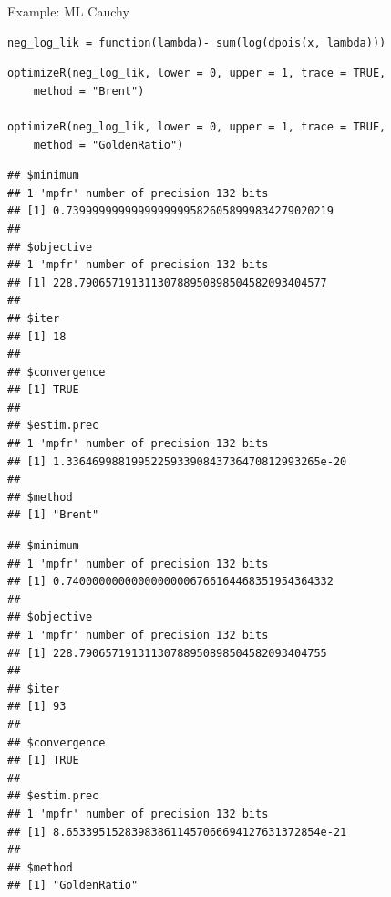 \documentclass[11pt,compress,t,notes=noshow, xcolor=table]{beamer}
\begin{document}
\begin{vbframe}{Example: ML Cauchy}
\begin{verbatim}
neg_log_lik = function(lambda)- sum(log(dpois(x, lambda)))
\end{verbatim}

\vspace{0.2cm}

\begin{verbatim}
optimizeR(neg_log_lik, lower = 0, upper = 1, trace = TRUE, 
	method = "Brent")

optimizeR(neg_log_lik, lower = 0, upper = 1, trace = TRUE, 
	method = "GoldenRatio")

\end{verbatim}







\framebreak 





\begin{verbatim}
## $minimum
## 1 'mpfr' number of precision 132 bits
## [1] 0.73999999999999999995826058999834279020219
##
## $objective
## 1 'mpfr' number of precision 132 bits
## [1] 228.79065719131130788950898504582093404577
##
## $iter
## [1] 18
##
## $convergence
## [1] TRUE
##
## $estim.prec
## 1 'mpfr' number of precision 132 bits
## [1] 1.336469988199522593390843736470812993265e-20
##
## $method
## [1] "Brent"
\end{verbatim}

\framebreak

\begin{verbatim}
## $minimum
## 1 'mpfr' number of precision 132 bits
## [1] 0.74000000000000000006766164468351954364332
##
## $objective
## 1 'mpfr' number of precision 132 bits
## [1] 228.79065719131130788950898504582093404755
##
## $iter
## [1] 93
##
## $convergence
## [1] TRUE
##
## $estim.prec
## 1 'mpfr' number of precision 132 bits
## [1] 8.653395152839838611457066694127631372854e-21
##
## $method
## [1] "GoldenRatio"
\end{verbatim}

\end{vbframe}
\end{document}
